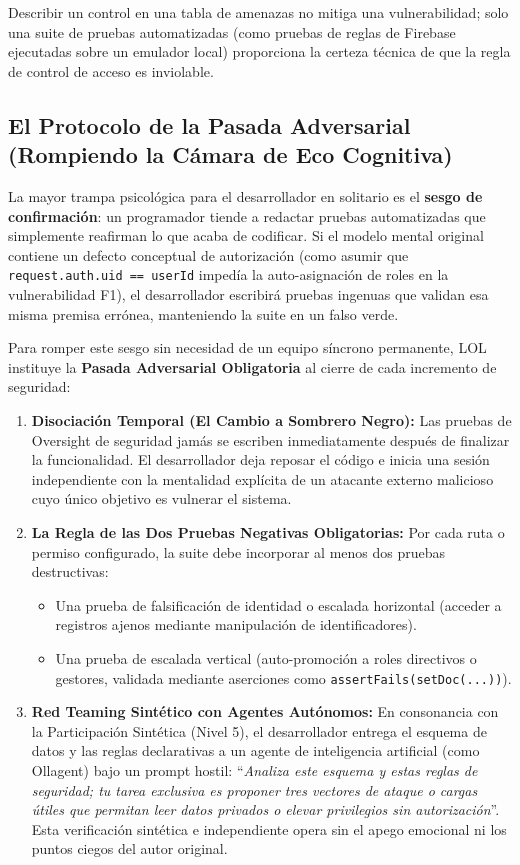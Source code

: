 \documentclass[14pt,a4paper,oneside]{extbook}
\begin{document}
Describir un control en una tabla de amenazas no mitiga una vulnerabilidad; solo una suite de pruebas automatizadas (como pruebas de reglas de Firebase ejecutadas sobre un emulador local) proporciona la certeza técnica de que la regla de control de acceso es inviolable.

\subsection{El Protocolo de la Pasada Adversarial (Rompiendo la Cámara de Eco Cognitiva)}

La mayor trampa psicológica para el desarrollador en solitario es el \textbf{sesgo de confirmación}: un programador tiende a redactar pruebas automatizadas que simplemente reafirman lo que acaba de codificar. Si el modelo mental original contiene un defecto conceptual de autorización (como asumir que \texttt{request.auth.uid == userId} impedía la auto-asignación de roles en la vulnerabilidad F1), el desarrollador escribirá pruebas ingenuas que validan esa misma premisa errónea, manteniendo la suite en un falso verde.

Para romper este sesgo sin necesidad de un equipo síncrono permanente, LOL instituye la \textbf{Pasada Adversarial Obligatoria} al cierre de cada incremento de seguridad:

\begin{enumerate}
    \item \textbf{Disociación Temporal (El Cambio a Sombrero Negro):} Las pruebas de Oversight de seguridad jamás se escriben inmediatamente después de finalizar la funcionalidad. El desarrollador deja reposar el código e inicia una sesión independiente con la mentalidad explícita de un atacante externo malicioso cuyo único objetivo es vulnerar el sistema.
    \item \textbf{La Regla de las Dos Pruebas Negativas Obligatorias:} Por cada ruta o permiso configurado, la suite debe incorporar al menos dos pruebas destructivas:
    \begin{itemize}
        \item Una prueba de falsificación de identidad o escalada horizontal (acceder a registros ajenos mediante manipulación de identificadores).
        \item Una prueba de escalada vertical (auto-promoción a roles directivos o gestores, validada mediante aserciones como \texttt{assertFails(setDoc(...))}).
    \end{itemize}
    \item \textbf{Red Teaming Sintético con Agentes Autónomos:} En consonancia con la Participación Sintética (Nivel 5), el desarrollador entrega el esquema de datos y las reglas declarativas a un agente de inteligencia artificial (como Ollagent) bajo un prompt hostil: \enquote{\textit{Analiza este esquema y estas reglas de seguridad; tu tarea exclusiva es proponer tres vectores de ataque o cargas útiles que permitan leer datos privados o elevar privilegios sin autorización}}. Esta verificación sintética e independiente opera sin el apego emocional ni los puntos ciegos del autor original.
\end{enumerate}
\end{document}
